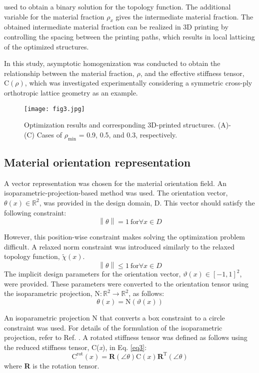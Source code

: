 \documentclass[a4paper,7pt,fleqn]{article}   %
\begin{document}
\begin{multicols}{2}
		used to obtain a binary solution for the topology function. The additional
		variable for the material fraction $\rho_{x}$ gives the intermediate
		material fraction. The obtained intermediate material fraction can be
		realized in 3D printing by controlling the spacing between the printing
		paths, which results in local latticing of the optimized structures.\par %
		In this study, asymptotic homogenization was conducted to obtain
		the relationship between the material fraction, $\rho$, and the effective
		stiffness tensor, $\mathrm{C}(\rho)$, which was investigated experimentally considering
		a symmetric cross-ply orthotropic lattice geometry as an example.
		\begin{figure*}[b!]
			\centering
			\texttt{[image: fig3.jpg]}
			\caption{\small Optimization results and corresponding 3D-printed structures. (A)-(C) Cases of $\rho_{\min}$ = 0.9, 0.5, and 0.3, respectively.}
			\label{fig3}
		\end{figure*}
		
		\subsection{Material orientation representation}
		A vector representation was chosen for the material orientation field.
		An isoparametric-projection-based method \cite{r22} was used. The orientation
		vector, $\theta (x)\in \mathbb{R}^{2}  $, was provided in the design domain, D. This vector
		should satisfy the following constraint:
		\begin{equation}
			\left \| \theta  \right \| =1\ \mathrm{for} \forall x\in D
			\label{eq4}
		\end{equation}  \par   %
		However, this position-wise constraint makes solving the optimization
		problem difficult. A relaxed norm constraint was introduced similarly
		to the relaxed topology function, $\tilde{\chi} (x)$.
		\begin{equation}
			\left \| \theta  \right \| \le 1\ \mathrm{for} \forall x\in D
			\label{eq5}
		\end{equation}
		The implicit design parameters for the orientation vector,
		$\vartheta (x)\in [-1,1]^{2}$, were provided. These parameters were converted to the
		orientation tensor using the isoparametric projection, $\mathrm{N}: \mathbb{R}^{2}\to \mathbb{R}^{2}$, as follows:
		\begin{equation}
			\theta(x)=\mathrm{N}(\vartheta(x))
			\label{eq6}
		\end{equation}    \par     %
		An isoparametric projection N that converts a box constraint to a
		circle constraint was used. For details of the formulation of the isoparametric
		projection, refer to Ref. \cite{r22}. A rotated stiffness tensor was
		defined as follows using the reduced stiffness tensor, C(\emph{x}), in Eq. \eqref{eq3}:
		\begin{equation}
			\mathrm{C}^{\mathrm{rot}}(x)=\mathbf{R}(\angle \theta)\mathrm{C}(x)\mathbf{R}^{\mathrm{T}}(\angle \theta)
			\label{eq7}
		\end{equation}
		where \textbf{R} is the rotation tensor.
		

\end{multicols}
\end{document}

